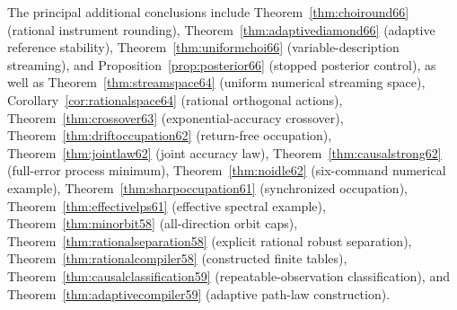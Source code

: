 \documentclass[11pt]{amsart}
\numberwithin{equation}{section}
\theoremstyle{definition}\newtheorem{definition}[theorem]{Definition}
\theoremstyle{remark}\newtheorem{remark}[theorem]{Remark}
\begin{document}
\noindent The principal additional conclusions include
Theorem~\ref{thm:choiround66} (rational instrument rounding),
Theorem~\ref{thm:adaptivediamond66} (adaptive reference stability),
Theorem~\ref{thm:uniformchoi66} (variable-description streaming),
and Proposition~\ref{prop:posterior66} (stopped posterior control),
as well as
Theorem~\ref{thm:streamspace64} (uniform numerical streaming space),
Corollary~\ref{cor:rationalspace64} (rational orthogonal actions),
Theorem~\ref{thm:crossover63} (exponential-accuracy crossover),
Theorem~\ref{thm:driftoccupation62} (return-free occupation),
Theorem~\ref{thm:jointlaw62} (joint accuracy law),
Theorem~\ref{thm:causalstrong62} (full-error process minimum),
Theorem~\ref{thm:noidle62} (six-command numerical example),
Theorem~\ref{thm:sharpoccupation61} (synchronized occupation),
Theorem~\ref{thm:effectivelps61} (effective spectral example),
Theorem~\ref{thm:minorbit58} (all-direction orbit caps),
Theorem~\ref{thm:rationalseparation58} (explicit rational robust separation),
Theorem~\ref{thm:rationalcompiler58} (constructed finite tables),
Theorem~\ref{thm:causalclassification59} (repeatable-observation
classification), and Theorem~\ref{thm:adaptivecompiler59} (adaptive
path-law construction).







































\appendix


\end{document}
